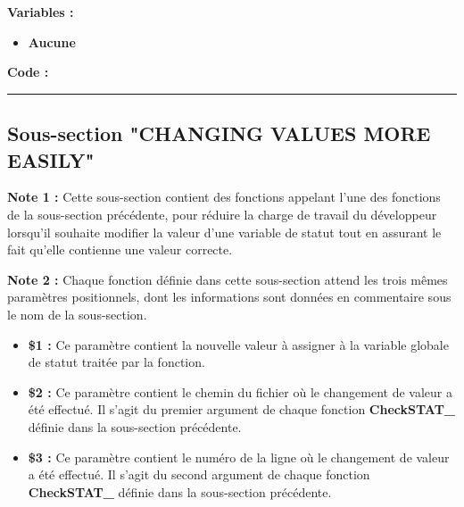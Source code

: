 \documentclass[a4paper,10pt]{article}
\begin{document}
\begin{justify}
    \textbf{Variables :}

    \begin{itemize}
        \item \textbf{Aucune}
    \end{itemize}
\end{justify}

\begin{justify}
    \textbf{Code :}
\end{justify}




\color{green}\par\noindent\rule{\textwidth}{0.4pt}\color{white}

\color{green}
\subsection{Sous-section "CHANGING VALUES MORE EASILY"}\color{white}

\begin{justify}
    \textbf{Note 1 :} Cette sous-section contient des fonctions appelant l'une des fonctions de la sous-section précédente, pour réduire la charge de travail du développeur lorsqu'il souhaite modifier la valeur d'une variable de statut tout en assurant le fait qu'elle contienne une valeur correcte.
\end{justify}

\begin{justify}
    \textbf{Note 2 :} Chaque fonction définie dans cette sous-section attend les trois mêmes paramètres positionnels, dont les informations sont données en commentaire sous le nom de la sous-section.

    \begin{itemize}
        \item \textbf{\$1 :} Ce paramètre contient la nouvelle valeur à assigner à la variable globale de statut traitée par la fonction.\\

        \item \textbf{\$2 :} Ce paramètre contient le chemin du fichier où le changement de valeur a été effectué. Il s'agit du premier argument de chaque fonction \textbf{\color{mauve}CheckSTAT\_} définie dans la sous-section précédente.\\

        \item \textbf{\$3 :} Ce paramètre contient le numéro de la ligne où le changement de valeur a été effectué. Il s'agit du second argument de chaque fonction \textbf{\color{mauve}CheckSTAT\_} définie dans la sous-section précédente.
    \end{itemize}
\end{justify}
\end{document}
